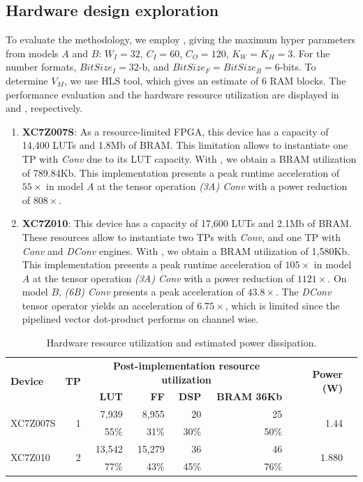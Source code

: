 \subsection{Hardware design exploration}
To evaluate the methodology, we employ , giving the maximum hyper parameters from models $A$ and $B$: $W_{I}=32$, $C_{I}=60$, $C_{O}=120$, $K_{W} = K_{H} =3$. For the number formats, $BitSize_{I}=32$-b, and $BitSize_{F} = BitSize_{B}=6$-bits. To determine $V_{M}$, we use HLS tool, which gives an estimate of 6 RAM blocks. The performance evaluation and the hardware resource utilization are displayed in  and , respectively.

\begin{enumerate}
\item{\textbf{XC7Z007S}}: As a resource-limited FPGA, this device has a capacity of 14,400 LUTs and 1.8Mb of BRAM. This limitation allows to instantiate one TP with \emph{Conv} due to its LUT capacity. With , we obtain a BRAM utilization of 789.84Kb. This implementation presents a peak runtime acceleration of $55\times$ in model $A$ at the tensor operation \emph{(3A) Conv} with a power reduction of $808\times$.

\item{\textbf{XC7Z010}}: This device has a capacity of 17,600 LUTs and 2.1Mb of BRAM. These resources allow to instantiate two TPs with \emph{Conv}, and one TP with \emph{Conv} and \emph{DConv} engines. With , we obtain a BRAM utilization of 1,580Kb. This implementation presents a peak runtime acceleration of $105\times$ in model $A$ at the tensor operation \emph{(3A) Conv} with a power reduction of $1121\times$. On model $B$, \emph{(6B) Conv} presents a peak acceleration of $43.8\times$. The \emph{DConv} tensor operator yields an acceleration of $6.75 \times$, which is limited since the pipelined vector dot-product performs on channel wise.
\end{enumerate}

\begin{table}[!h]\centering
	\caption{Hardware resource utilization and estimated power dissipation.}\label{tab:resource}
	\scriptsize
	\begin{tabular}{lrrrrrrr}\toprule
		\multirow{2}{*}{\textbf{Device}} &\multirow{2}{*}{\textbf{TP}} &\multicolumn{4}{c}{\textbf{Post-implementation resource utilization}} &\multirow{2}{*}{\textbf{Power (W)}} \\\cmidrule{3-6}
		& &\textbf{LUT} &\textbf{FF} &\textbf{DSP} &\textbf{BRAM 36Kb} & \\\midrule
		\multirow{2}{*}{XC7Z007S} &\multirow{2}{*}{1} &7,939 &8,955 &20 &25 &\multirow{2}{*}{1.44} \\
		& &55\% &31\% &30\% &50\% & \\\midrule
		\multirow{2}{*}{XC7Z010} &\multirow{2}{*}{2} &13,542 &15,279 &36 &46 &\multirow{2}{*}{1.880} \\
		& &77\% &43\% &45\% &76\% & \\
		\bottomrule
	\end{tabular}
\end{table}
